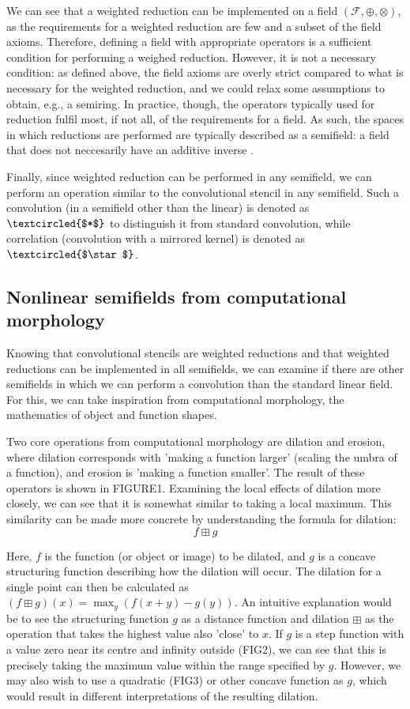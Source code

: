 \documentclass[11pt]{article} %
\begin{document}
We can see that a weighted reduction can be implemented on a field $(\mathcal{F}, \oplus, \otimes)$, as the requirements for a weighted reduction are few and a subset of the field axioms. Therefore, defining a field with appropriate operators is a sufficient condition for performing a weighed reduction. However, it is not a necessary condition: as defined above, the field axioms are overly strict compared to what is necessary for the weighted reduction, and we could relax some assumptions to obtain, e.g., a semiring. In practice, though, the operators typically used for reduction fulfil most, if not all, of the requirements for a field. As such, the spaces in which reductions are performed are typically described as a semifield: a field that does not neccesarily have an additive inverse \cite{bellaardaxiomatic}.

Finally, since weighted reduction can be performed in any semifield, we can perform an operation similar to the convolutional stencil in any semifield. Such a convolution (in a semifield other than the linear) is denoted as $\textcircled{$*$}$ to distinguish it from standard convolution, while correlation (convolution with a mirrored kernel) is denoted as $\textcircled{$\star$}$.

\subsection{Nonlinear semifields from computational morphology}
Knowing that convolutional stencils are weighted reductions and that weighted reductions can be implemented in all semifields, we can examine if there are other semifields in which we can perform a convolution than the standard linear field. For this, we can take inspiration from computational morphology, the mathematics of object and function shapes.

Two core operations from computational morphology are dilation and erosion, where dilation corresponds with 'making a function larger' (scaling the umbra of a function), and erosion is 'making a function smaller'. The result of these operators is shown in FIGURE1. Examining the local effects of dilation more closely, we can see that it is somewhat similar to taking a local maximum. This similarity can be made more concrete by understanding the formula for dilation: $$f \boxplus g$$

Here, $f$ is the function (or object or image) to be dilated, and $g$ is a concave structuring function describing how the dilation will occur. The dilation for a single point can then be calculated as $(f \boxplus g)(x) = \max_y \left(f(x+y) - g(y)\right)$. An intuitive explanation would be to see the structuring function $g$ as a distance function and dilation $\boxplus$ as the operation that takes the highest value also 'close' to $x$. If $g$ is a step function with a value zero near its centre and infinity outside (FIG2), we can see that this is precisely taking the maximum value within the range specified by $g$. However, we may also wish to use a quadratic (FIG3) or other concave function as $g$, which would result in different interpretations of the resulting dilation.
\end{document}
